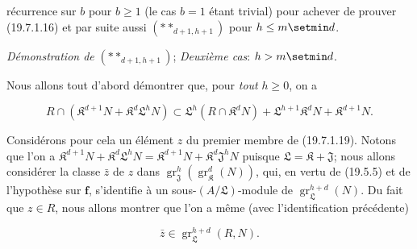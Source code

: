 récurrence sur $b$ pour $b\geq1$ (le cas $b=1$ étant trivial) pour achever de prouver (19.7.1.16) et par suite aussi $(**_{d+1,h+1})$ pour $h\leq m\setmin d$.

\begin{env}[19.7.1.18]
\label{IV.19.7.1.18}
\emph{Démonstration de} $(**_{d+1,h+1})$; \emph{Deuxième cas}: $h>m\setmin d$.
\end{env}

Nous allons tout d'abord démontrer que, pour \emph{tout} $h\geq0$, on a
\begin{env}[19.7.1.19]
\label{IV.19.7.1.19}
\[
  R\cap(\mathfrak K^{d+1}N+\mathfrak K^d\mathfrak L^hN)\subset\mathfrak L^h(R\cap\mathfrak K^dN)+\mathfrak L^{h+1}\mathfrak K^dN+\mathfrak K^{d+1}N.
\]
\end{env}

Considérons pour cela un élément $z$ du premier membre de (19.7.1.19). Notons que l'on a $\mathfrak K^{d+1}N+\mathfrak K^d\mathfrak L^hN=\mathfrak K^{d+1}N+\mathfrak K^d\mathfrak J^hN$ puisque $\mathfrak L=\mathfrak K+\mathfrak J$; nous allons considérer la classe $\bar z$ de $z$ dans $\operatorname{gr}_{\mathfrak J}^h(\operatorname{gr}_{\mathfrak K}^d(N))$, qui, en vertu de (19.5.5) et de l'hypothèse sur $\mathbf f$, s'identifie à un sous-$(A/\mathfrak L)$-module de $\operatorname{gr}_{\mathfrak L}^{h+d}(N)$. Du fait que $z\in R$, nous allons montrer que l'on a même (avec l'identification précédente)
\begin{env}[19.7.1.20]
\label{IV.19.7.1.20}
\[
  \bar z\in\operatorname{gr}_{\mathfrak L}^{h+d}(R,N).
\]
\end{env}

